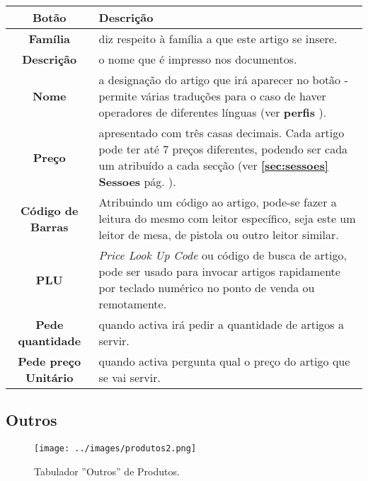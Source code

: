 \documentclass[a4paper,11pt,openany]{memoir}
\begin{document}
\begin{table}[ht]
 \centering
\small
\def\arraystretch{1.5}
 \begin{tabular}{c p{11cm}}  %
 \textbf{Botão} & \textbf{Descrição}  \\ %
 \hline
 \textbf{Família} & diz respeito à família a que este artigo se insere. \\
 \textbf{Descrição} & o nome que é impresso nos documentos. \\
 \textbf{Nome} & a designação do artigo que irá aparecer no botão - permite várias traduções para o
 caso de haver operadores de diferentes línguas (ver \textbf{perfis} ). \\
 \textbf{Preço} & apresentado com três casas decimais. Cada artigo pode ter até 7 preços diferentes, 
podendo ser cada um atribuído a cada secção (ver \textbf{ \ref{sec:sessoes} Sessoes} pág. \pageref{sec:sessoes}). \\
 \textbf{Código de Barras} & Atribuindo um código ao artigo, pode-se fazer a leitura do 
mesmo com leitor específico, seja este um leitor de mesa, de pistola ou outro leitor similar. \\
 \textbf{PLU} & \emph{Price Look Up Code} ou código de busca de artigo, pode ser usado para 
invocar artigos rapidamente por teclado numérico no ponto de venda ou remotamente. \\
 \textbf{Pede quantidade} & quando activa irá pedir a quantidade de artigos a servir. \\
 \textbf{Pede preço Unitário} &  quando activa pergunta qual o preço do artigo que se vai servir. \\
 \hline
 \end{tabular}
 \end{table}





\newpage
\subsection{Outros}


\begin{figure}[h]
\begin{center}
\texttt{[image: ../images/produtos2.png]}
\caption[Submanifold]{Tabulador ''Outros'' de Produtos.}
\label{produtos}
\end{center}
\end{figure}
\end{document}
